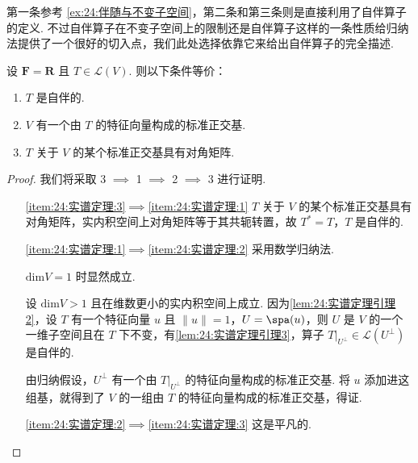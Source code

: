 第一条参考 \autoref{ex:24:伴随与不变子空间}，第二条和第三条则是直接利用了自伴算子的定义. 不过自伴算子在不变子空间上的限制还是自伴算子这样的一条性质给归纳法提供了一个很好的切入点，我们此处选择依靠它来给出自伴算子的完全描述.

\begin{theorem}[实谱定理] \label{thm:24:实谱定理} 
    设 $ \mathbf{F} = \mathbf{R} $ 且 $ T \in \mathcal{L}(V) $. 则以下条件等价：
    \begin{enumerate}
        \item \label{item:24:实谱定理:1}
              $ T $ 是自伴的.

        \item \label{item:24:实谱定理:2}
              $ V $ 有一个由 $ T $ 的特征向量构成的标准正交基.

        \item \label{item:24:实谱定理:3}
              $ T $ 关于 $ V $ 的某个标准正交基具有对角矩阵.
    \end{enumerate}
\end{theorem}

\begin{proof}
    我们将采取 3 $\implies$ 1 $\implies$ 2 $\implies$ 3 进行证明.

    \begin{itemize}
        \item[\ref*{item:24:实谱定理:3}$\implies$\ref*{item:24:实谱定理:1}] $ T $ 关于 $ V $ 的某个标准正交基具有对角矩阵，实内积空间上对角矩阵等于其共轭转置，故 $ T^* = T $，$ T $ 是自伴的.

        \item[\ref*{item:24:实谱定理:1}$\implies$\ref*{item:24:实谱定理:2}] 采用数学归纳法.

            $ \mathrm{dim}V = 1 $ 时显然成立.

            设 $ \mathrm{dim}V > 1 $ 且在维数更小的实内积空间上成立. 因为\autoref{lem:24:实谱定理引理2}，设 $ T $ 有一个特征向量 $ u $ 且 $ \lVert u \rVert = 1 $，$ U = \spa(u) $，则 $ U $ 是 $ V $ 的一个一维子空间且在 $ T $ 下不变，有\autoref{lem:24:实谱定理引理3}，算子 $ T|_{U^{\perp }} \in \mathcal{L}(U^{\perp }) $ 是自伴的.

            由归纳假设，$ U^{\perp } $ 有一个由 $ T|_{U^{\perp }} $ 的特征向量构成的标准正交基. 将 $ u $ 添加进这组基，就得到了 $ V $ 的一组由 $ T $ 的特征向量构成的标准正交基，得证.

        \item[\ref*{item:24:实谱定理:2}$\implies$\ref*{item:24:实谱定理:3}] 这是平凡的.
    \end{itemize}
\end{proof}


